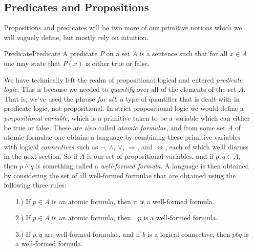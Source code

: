     \subsection{Predicates and Propositions}
        Propositions and predicates will be two more of our primitive notions
        which we will vaguely define, but mostly rely on intuition.
        \begin{fdefinition}{Predicate}{Predicate}
            A \gls{predicate} $P$ on a \gls{set} $A$ is a sentence such that for
            all $x\in{A}$ one may state that $P(x)$ is either true or false.%
        \end{fdefinition}
        We have technically left the realm of propositional logical and entered
        \textit{predicate logic}.
        This is because we needed to \textit{quantify} over all of the elements
        of the set $A$. That is, we've used the phrase \textit{for all}, a type
        of quantifier that is dealt with in predicate logic, not propositional.
        In strict propositional logic we would define a \textit{propositional}
        \textit{variable}, which is a primitive
        taken to be a variable which can either be true or false. These are also
        called \textit{atomic formulae}, and from some set
        $A$ of atomic formulae one obtains a language by combining these
        primitive variables with logical \textit{connectives} such as $\neg$,
        $\land$, $\lor$, $\Rightarrow$, and $\Leftrightarrow$, each of which
        we'll discuss in the next section. So if $A$ is our set of propositional
        variables, and if $p,q\in{A}$, then $p\land{q}$ is something called a
        \textit{well-formed formula}. A language is then obtained by considering
        the set of all well-formed formulae that are obtained using the
        following three rules:
        \begin{itemize}
            \item[1.)] If $p\in{A}$ is an atomic formula, then it is a
                       well-formed formula.
            \item[2.)] If $p\in{A}$ is an atomic formula, then $\neg{p}$ is a
                       well-formed formula. 
            \item[3.)] If $p,q$ are well-formed formulae, and if $b$ is a
                       logical connective, then $pbq$ is a well-formed formula.  
        \end{itemize}
